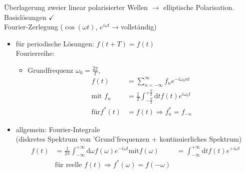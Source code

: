 \documentclass[a4paper]{article}
\begin{document}
Überlagerung zweier linear polarisierter Wellen $\rightarrow$ elliptische
Polarisation. \\ Basislösungen $\checkmark$\\
Fourier-Zerlegung ($\cos(\omega t)$, $e^{i\omega t}\rightarrow$vollständig)
\begin{itemize}
  \item für periodische Lösungen: $f(t+T)=f(t)$\\ 
  Fourierreihe: 
  \begin{itemize}
  \item Grundfrequenz $\omega_0=\frac{2\pi}{T}$, \begin{align}
  f(t)&=\sum_{n=-\infty}^\infty f_n e^{-i\omega_0nt}\\
  \text{mit } f_n&=\frac{1}{T}\int_{-\frac{T}{2}}^{+\frac{T}{2}}\mathrm{d}t f(t)
  e^{i\omega_0 t} \\
  \text{für} f^*(t)&=f(t) \Rightarrow f_n^*=f_{-n}
  \end{align}
\end{itemize}
\item allgemein: Fourier-Integrale \\(diskretes Spektrum von 'Grund'frequenzen
+ kontinuierliches Spektrum) \begin{align}
f(t)&=\frac{1}{2\pi}\int_{-\infty}^{+\infty} \mathrm{d}\omega f(\omega)e^{-i\omega t}
\text{mit} f(\omega)&=\int_{-\infty}^{+\infty} \mathrm{d}t f(t)e^{+i\omega t}\\
&\text{für reelle } f(t) \Rightarrow f^*(\omega)=f(-\omega)
\end{align}
\end{itemize}
\end{document}
